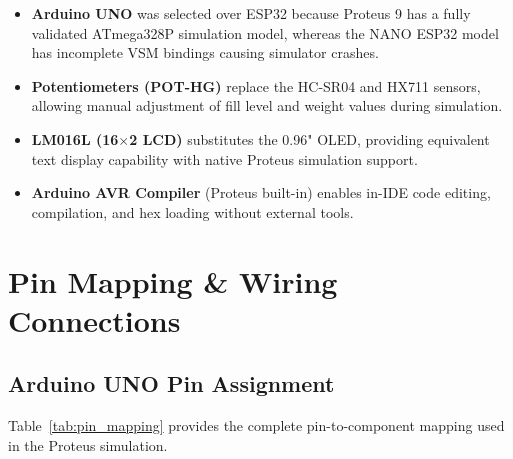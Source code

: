 \documentclass[12pt,a4paper]{article}
\begin{document}
\begin{tcolorbox}[colback=green!5!white, colframe=greengold, title=\textbf{Component Selection Rationale}]
\begin{itemize}[leftmargin=*]
    \item \textbf{Arduino UNO} was selected over ESP32 because Proteus 9 has a fully validated ATmega328P simulation model, whereas the NANO ESP32 model has incomplete VSM bindings causing simulator crashes.
    \item \textbf{Potentiometers (POT-HG)} replace the HC-SR04 and HX711 sensors, allowing manual adjustment of fill level and weight values during simulation.
    \item \textbf{LM016L (16$\times$2 LCD)} substitutes the 0.96" OLED, providing equivalent text display capability with native Proteus simulation support.
    \item \textbf{Arduino AVR Compiler} (Proteus built-in) enables in-IDE code editing, compilation, and hex loading without external tools.
\end{itemize}
\end{tcolorbox}

\section{Pin Mapping \& Wiring Connections}

\subsection{Arduino UNO Pin Assignment}

Table~\ref{tab:pin_mapping} provides the complete pin-to-component mapping used in the Proteus simulation.
\end{document}
